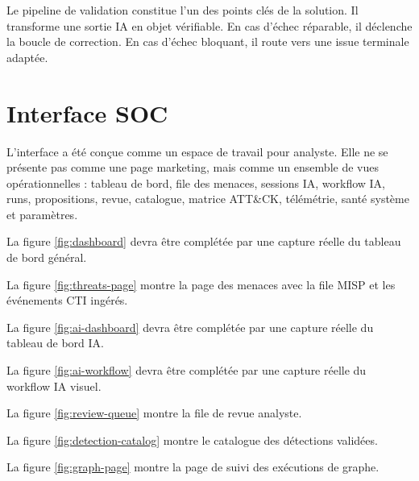 Le pipeline de validation constitue l'un des points clés de la solution. Il transforme une sortie IA en objet vérifiable. En cas d'échec réparable, il déclenche la boucle de correction. En cas d'échec bloquant, il route vers une issue terminale adaptée.

\section{Interface SOC}

L'interface a été conçue comme un espace de travail pour analyste. Elle ne se présente pas comme une page marketing, mais comme un ensemble de vues opérationnelles : tableau de bord, file des menaces, sessions IA, workflow IA, runs, propositions, revue, catalogue, matrice ATT\&CK, télémétrie, santé système et paramètres.

La figure \ref{fig:dashboard} devra être complétée par une capture réelle du tableau de bord général.

La figure \ref{fig:threats-page} montre la page des menaces avec la file MISP et les événements CTI ingérés.

La figure \ref{fig:ai-dashboard} devra être complétée par une capture réelle du tableau de bord IA.

La figure \ref{fig:ai-workflow} devra être complétée par une capture réelle du workflow IA visuel.

La figure \ref{fig:review-queue} montre la file de revue analyste.

La figure \ref{fig:detection-catalog} montre le catalogue des détections validées.

La figure \ref{fig:graph-page} montre la page de suivi des exécutions de graphe.

